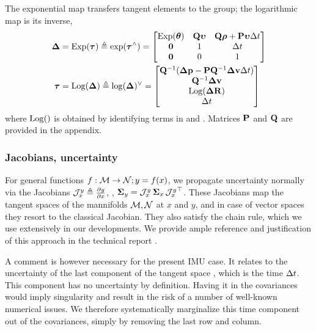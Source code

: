 The exponential map transfers tangent elements to the group; the logarithmic map is its inverse,
%
\begin{align}
    \D &= \Exp(\bftau) \te \exp(\bftau\hhat) = \begin{bmatrix}
    \Exp(\bth) & \bfQ\bfupsilon & \bfQ\bfrho+\bfP\bfupsilon\Dt \\
    \bf0 & 1 & \Dt \\
    \bf0 & 0 & 1
    \end{bmatrix} %
    \label{equ:exp}
    \\
    \bftau &= \Log(\D) \te \log(\D)\vvee = \begin{bmatrix}
    \bfQ\inv(\Dp-\bfP\bfQ\inv\Dv\Dt) \\
    \bfQ\inv\Dv \\
    \Log(\DR) \\
    \Dt 
    \end{bmatrix} %
    \label{equ:log}
\end{align}
%
where $\operatorname*{Log}()$ is obtained by identifying terms in  and .
Matrices ${\bf P}$ and ${\bf Q}$ are provided in the appendix.


\subsubsection{Jacobians, uncertainty}
\label{sec:uncertainty}

For general functions $f:\mathcal{M}\to\mathcal{N};y=f(x)$, we propagate uncertainty normally via the Jacobians ${\mathcal{J}^{y}_{x}}\triangleq\frac{\partial y}{\partial x}$, \ie, ${\bm \Sigma}_y={\mathcal{J}^{y}_{x}}\,{\bm \Sigma}_x\,{\mathcal{J}^{y}_{x}}^{\top}$. 
These Jacobians map the tangent spaces of the mannifolds $\mathcal{M},\mathcal{N}$ at $x$ and $y$, and in case of vector spaces they resort to the classical Jacobian.
They also satisfy the chain rule, which we use extensively in our developments.
We provide ample reference and justification of this approach in the technical report \cite{sola2018micro}.

A comment is however necessary for the present IMU case.
It relates to the uncertainty of the last component of the tangent space , which is the time $\Delta t$. This component has no uncertainty by definition. 
Having it in the covariances would imply singularity and result in the risk of a number of well-known numerical issues. 
We therefore systematically marginalize this time component out of the covariances, simply by removing the last row and column. 





